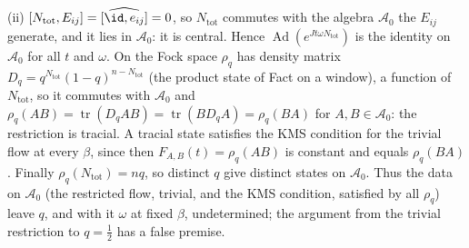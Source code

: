 (ii) $[N_{\mathrm{tot}}, E_{ij}] = \widehat{[\id, e_{ij}]} = 0$, so $N_{\mathrm{tot}}$ commutes with the algebra $\mathcal{A}_{0}$ the $E_{ij}$ generate, and it lies in $\mathcal{A}_{0}$: it is central. Hence $\operatorname{Ad}(e^{Jt\omega N_{\mathrm{tot}}})$ is the identity on $\mathcal{A}_{0}$ for all $t$ and $\omega$. On the Fock space $\rho_{q}$ has density matrix $D_{q} = q^{N_{\mathrm{tot}}}(1 - q)^{n - N_{\mathrm{tot}}}$ (the product state of Fact  on a window), a function of $N_{\mathrm{tot}}$, so it commutes with $\mathcal{A}_{0}$ and $\rho_{q}(AB) = \operatorname{tr}(D_{q}AB) = \operatorname{tr}(BD_{q}A) = \rho_{q}(BA)$ for $A, B \in \mathcal{A}_{0}$: the restriction is tracial. A tracial state satisfies the KMS condition for the trivial flow at every $\beta$, since then $F_{A,B}(t) = \rho_{q}(AB)$ is constant and equals $\rho_{q}(BA)$. Finally $\rho_{q}(N_{\mathrm{tot}}) = nq$, so distinct $q$ give distinct states on $\mathcal{A}_{0}$. Thus the data on $\mathcal{A}_{0}$ (the restricted flow, trivial, and the KMS condition, satisfied by all $\rho_{q}$) leave $q$, and with it $\omega$ at fixed $\beta$, undetermined; the argument from the trivial restriction to $q = \tfrac12$ has a false premise.

